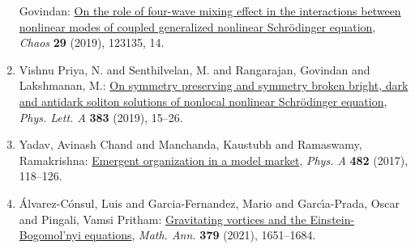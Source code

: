 \begin{enumerate}
Govindan: \href{https://doi.org/10.1063/1.5121245}{On the role of four-wave mixing effect in the interactions
between nonlinear modes of coupled generalized nonlinear
{S}chr\"{o}dinger equation}, \emph{Chaos} {\bf 29} (2019), 123135, 14.
\item Vishnu Priya, N. and Senthilvelan, M. and Rangarajan, Govindan
and Lakshmanan, M.: \href{https://doi.org/10.1016/j.physleta.2018.10.011}{On symmetry preserving and symmetry broken bright, dark and
antidark soliton solutions of nonlocal nonlinear {S}chr\"{o}dinger
equation}, \emph{Phys. Lett. A} {\bf 383} (2019), 15--26.
\item Yadav, Avinash Chand and Manchanda, Kaustubh and Ramaswamy,
Ramakrishna: \href{https://doi.org/10.1016/j.physa.2017.04.029}{Emergent organization in a model market}, \emph{Phys. A} {\bf 482} (2017), 118--126.
\item \'{A}lvarez-C\'{o}nsul, Luis and Garcia-Fernandez, Mario and
Garc\'{\i}a-Prada, Oscar and Pingali, Vamsi Pritham: \href{https://doi.org/10.1007/s00208-020-01964-z}{Gravitating vortices and the {E}instein-{B}ogomol'nyi
equations}, \emph{Math. Ann.} {\bf 379} (2021), 1651--1684.
\end{enumerate}
